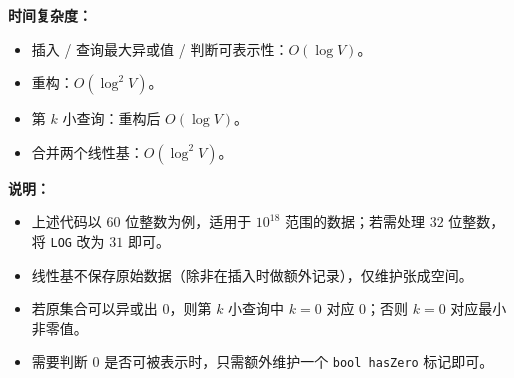 \textbf{时间复杂度：}
\begin{itemize}
    \item 插入 / 查询最大异或值 / 判断可表示性：$O(\log V)$。
    \item 重构：$O(\log^2 V)$。
    \item 第 $k$ 小查询：重构后 $O(\log V)$。
    \item 合并两个线性基：$O(\log^2 V)$。
\end{itemize}



\textbf{说明：}
\begin{itemize}
    \item 上述代码以 $60$ 位整数为例，适用于 $10^{18}$ 范围的数据；若需处理 $32$ 位整数，将 \texttt{LOG} 改为 $31$ 即可。
    \item 线性基不保存原始数据（除非在插入时做额外记录），仅维护张成空间。
    \item 若原集合可以异或出 $0$，则第 $k$ 小查询中 $k=0$ 对应 $0$；否则 $k=0$ 对应最小非零值。
    \item 需要判断 $0$ 是否可被表示时，只需额外维护一个 \texttt{bool hasZero} 标记即可。
\end{itemize}
